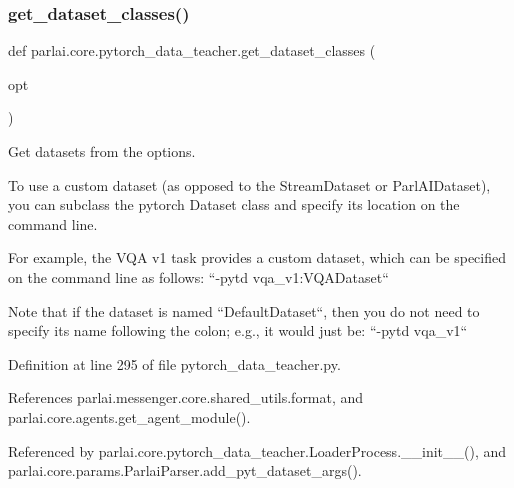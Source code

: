 \subsubsection{\texorpdfstring{get\+\_\+dataset\+\_\+classes()}{get\_dataset\_classes()}}
{\footnotesize\ttfamily def parlai.\+core.\+pytorch\+\_\+data\+\_\+teacher.\+get\+\_\+dataset\+\_\+classes (\begin{DoxyParamCaption}\item[{}]{opt }\end{DoxyParamCaption})}

\begin{DoxyVerb}Get datasets from the options.

To use a custom dataset (as opposed to the StreamDataset or ParlAIDataset),
you can subclass the pytorch Dataset class and specify its location on the
command line.

For example, the VQA v1 task provides a custom dataset, which can
be specified on the command line as follows: ``-pytd vqa_v1:VQADataset``

Note that if the dataset is named ``DefaultDataset``, then you do
not need to specify its name following the colon; e.g., it
would just be: ``-pytd vqa_v1``
\end{DoxyVerb}
 

Definition at line 295 of file pytorch\+\_\+data\+\_\+teacher.\+py.



References parlai.\+messenger.\+core.\+shared\+\_\+utils.\+format, and parlai.\+core.\+agents.\+get\+\_\+agent\+\_\+module().



Referenced by parlai.\+core.\+pytorch\+\_\+data\+\_\+teacher.\+Loader\+Process.\+\_\+\+\_\+init\+\_\+\+\_\+(), and parlai.\+core.\+params.\+Parlai\+Parser.\+add\+\_\+pyt\+\_\+dataset\+\_\+args().

